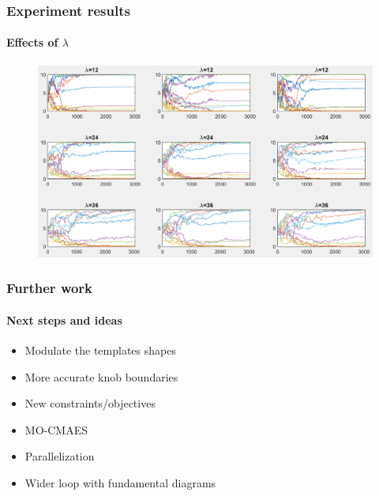 \documentclass[fleqn]{beamer}
\begin{document}
\begin{frame}
	\frametitle{Experiment results}
	\framesubtitle{Effects of $\lambda$}
	\begin{figure}
		\centering
		\includegraphics[width=4.5in]{figures/results_figures/lambda/knobs_lambda_all_genmean.png}
	\end{figure}
\end{frame}


\begin{frame}
	\frametitle{Further work}
	\framesubtitle{Next steps and ideas}
	\begin{itemize}
		\item Modulate the templates shapes
		\item More accurate knob boundaries
		\item New constraints/objectives
		\item MO-CMAES
		\item Parallelization
		\item Wider loop with fundamental diagrams
	\end{itemize}
\end{frame}
\end{document}
